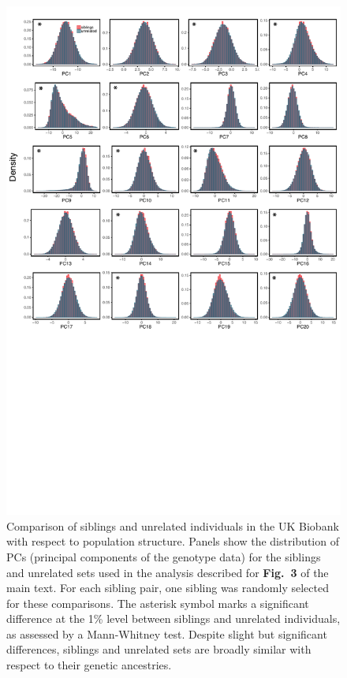 \documentclass[hidelinks, 12pt]{article}
\begin{document}
\pagebreak

\begin{figure}[h]
\centering
\includegraphics[width=\textwidth]{./supp_figures/sibs_unrel_compare2.pdf}
\caption[Comparison of siblings and unrelated individuals in the UK Biobank with respect to population structure]{\small Comparison of siblings and unrelated individuals in the UK Biobank with respect to population structure. Panels show the distribution of PCs (principal components of the genotype data) for the siblings and unrelated sets used in the analysis described for {\bf Fig.~3} of the main text. For each sibling pair, one sibling was randomly selected for these comparisons. The asterisk symbol marks a significant difference at the 1\% level between siblings and unrelated individuals, as assessed by a Mann-Whitney test. Despite slight but significant differences, siblings and unrelated sets are broadly similar with respect to their genetic ancestries.}
\end{figure}
\end{document}
